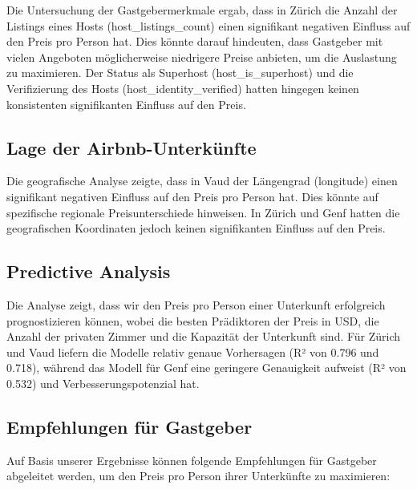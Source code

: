 \documentclass[
  journal,
]{IEEEtran}%
\begin{document}
Die Untersuchung der Gastgebermerkmale ergab, dass in Zürich die Anzahl
der Listings eines Hosts (host\_listings\_count) einen signifikant
negativen Einfluss auf den Preis pro Person hat. Dies könnte darauf
hindeuten, dass Gastgeber mit vielen Angeboten möglicherweise niedrigere
Preise anbieten, um die Auslastung zu maximieren. Der Status als
Superhost (host\_is\_superhost) und die Verifizierung des Hosts
(host\_identity\_verified) hatten hingegen keinen konsistenten
signifikanten Einfluss auf den Preis.

\hypertarget{lage-der-airbnb-unterkuxfcnfte}{%
\subsection{Lage der
Airbnb-Unterkünfte}\label{lage-der-airbnb-unterkuxfcnfte}}

Die geografische Analyse zeigte, dass in Vaud der Längengrad (longitude)
einen signifikant negativen Einfluss auf den Preis pro Person hat. Dies
könnte auf spezifische regionale Preisunterschiede hinweisen. In Zürich
und Genf hatten die geografischen Koordinaten jedoch keinen
signifikanten Einfluss auf den Preis.

\hypertarget{predictive-analysis-2}{%
\subsection{Predictive Analysis}\label{predictive-analysis-2}}

Die Analyse zeigt, dass wir den Preis pro Person einer Unterkunft
erfolgreich prognostizieren können, wobei die besten Prädiktoren der
Preis in USD, die Anzahl der privaten Zimmer und die Kapazität der
Unterkunft sind. Für Zürich und Vaud liefern die Modelle relativ genaue
Vorhersagen (R² von 0.796 und 0.718), während das Modell für Genf eine
geringere Genauigkeit aufweist (R² von 0.532) und Verbesserungspotenzial
hat.

\hypertarget{empfehlungen-fuxfcr-gastgeber}{%
\subsection{Empfehlungen für
Gastgeber}\label{empfehlungen-fuxfcr-gastgeber}}

Auf Basis unserer Ergebnisse können folgende Empfehlungen für Gastgeber
abgeleitet werden, um den Preis pro Person ihrer Unterkünfte zu
maximieren:
\end{document}
